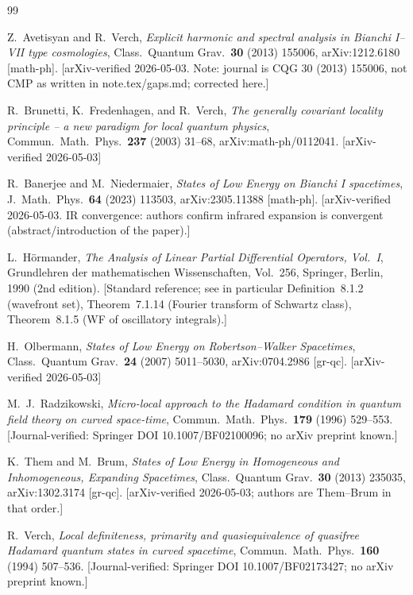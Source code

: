 \documentclass[12pt, a4paper]{article}
\theoremstyle{remark}
\begin{document}
\begin{thebibliography}{99}

Z.~Avetisyan and R.~Verch,
\emph{Explicit harmonic and spectral analysis in Bianchi I--VII type cosmologies},
Class.\ Quantum Grav.\ \textbf{30} (2013) 155006,
arXiv:1212.6180 [math-ph].
[arXiv-verified 2026-05-03.  Note: journal is CQG 30 (2013) 155006,
not CMP as written in note.tex/gaps.md; corrected here.]

R.~Brunetti, K.~Fredenhagen, and R.~Verch,
\emph{The generally covariant locality principle -- a new paradigm for local
quantum physics},
Commun.\ Math.\ Phys.\ \textbf{237} (2003) 31--68,
arXiv:math-ph/0112041.
[arXiv-verified 2026-05-03]

R.~Banerjee and M.~Niedermaier,
\emph{States of Low Energy on Bianchi I spacetimes},
J.\ Math.\ Phys.\ \textbf{64} (2023) 113503,
arXiv:2305.11388 [math-ph].
[arXiv-verified 2026-05-03.  IR convergence: authors confirm infrared
expansion is convergent (abstract/introduction of the paper).]

L.~H\"{o}rmander,
\emph{The Analysis of Linear Partial Differential Operators, Vol.~I},
Grundlehren der mathematischen Wissenschaften, Vol.~256,
Springer, Berlin, 1990 (2nd edition).
[Standard reference; see in particular Definition~8.1.2 (wavefront set),
Theorem~7.1.14 (Fourier transform of Schwartz class),
Theorem~8.1.5 (WF of oscillatory integrals).]

H.~Olbermann,
\emph{States of Low Energy on Robertson--Walker Spacetimes},
Class.\ Quantum Grav.\ \textbf{24} (2007) 5011--5030,
arXiv:0704.2986 [gr-qc].
[arXiv-verified 2026-05-03]

M.~J.~Radzikowski,
\emph{Micro-local approach to the Hadamard condition in quantum field theory
on curved space-time},
Commun.\ Math.\ Phys.\ \textbf{179} (1996) 529--553.
[Journal-verified: Springer DOI 10.1007/BF02100096; no arXiv preprint known.]

K.~Them and M.~Brum,
\emph{States of Low Energy in Homogeneous and Inhomogeneous, Expanding
Spacetimes},
Class.\ Quantum Grav.\ \textbf{30} (2013) 235035,
arXiv:1302.3174 [gr-qc].
[arXiv-verified 2026-05-03; authors are Them--Brum in that order.]

R.~Verch,
\emph{Local definiteness, primarity and quasiequivalence of quasifree Hadamard
quantum states in curved spacetime},
Commun.\ Math.\ Phys.\ \textbf{160} (1994) 507--536.
[Journal-verified: Springer DOI 10.1007/BF02173427; no arXiv preprint known.]

\end{thebibliography}
\end{document}
